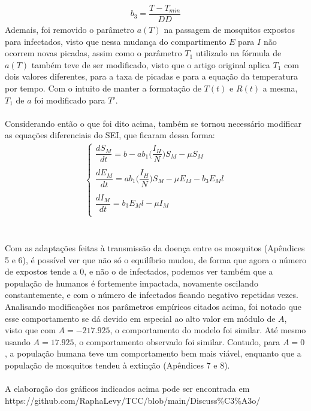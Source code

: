 \documentclass[12pt]{article}
\begin{document}
\begin{gather*}
    b_3 = \dfrac{T-T_{min}}{DD}
\end{gather*}
Ademais, foi removido o parâmetro $a(T)$ na passagem de mosquitos expostos para infectados, visto que nessa mudança do compartimento $E$ para $I$ não ocorrem novas picadas, assim como o parâmetro $T_1$ utilizado na fórmula de $a(T)$ também teve de ser modificado, visto que o artigo original aplica $T_1$ com dois valores diferentes, para a taxa de picadas e para a equação da temperatura por tempo. Com o intuito de manter a formatação de $T(t)$ e $R(t)$ a mesma, $T_1$ de $a$ foi modificado para $T'$.
\\\\
Considerando então o que foi dito acima, também se tornou necessário modificar as equações diferenciais do SEI, que ficaram dessa forma:
\begin{gather*}
\begin{cases}
\dfrac{dS_M}{dt} = b - ab_1\bigg(\dfrac{I_H}{N}\bigg)S_M - \mu S_M\\
\\
\dfrac{dE_M}{dt} = ab_1\bigg(\dfrac{I_H}{N}\bigg)S_M - \mu E_M - b_3E_Ml\\
\\
\dfrac{dI_M}{dt} = b_3E_Ml -\mu I_M\\
\end{cases}
\end{gather*}
\\\\
Com as adaptações feitas à transmissão da doença entre os mosquitos (Apêndices 5 e 6), é possível ver que não só o equilíbrio mudou, de forma que agora o número de expostos tende a 0, e não o de infectados, podemos ver também que a população de humanos é fortemente impactada, novamente oscilando constantemente, e com o número de infectados ficando negativo repetidas vezes. Analisando modificações nos parâmetros empíricos citados acima, foi notado que esse comportamento se dá devido em especial ao alto valor em módulo de $A$, visto que com $A=-217.925$, o comportamento do modelo foi similar. Até mesmo usando $A=17.925$, o comportamento observado foi similar. Contudo, para $A=0$, a população humana teve um comportamento bem mais viável, enquanto que a população de mosquitos tendeu à extinção (Apêndices 7 e 8).
\\\\
A elaboração dos gráficos indicados acima pode ser encontrada em
\\
https://github.com/RaphaLevy/TCC/blob/main/Discuss\%C3\%A3o/
\end{document}
